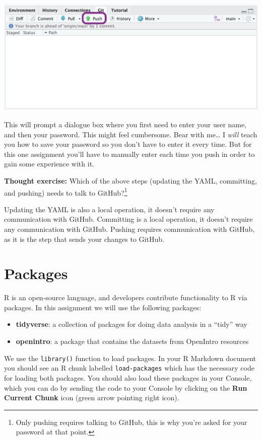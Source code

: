 \documentclass[
]{article}
\providecommand{\tightlist}{%
  \setlength{\itemsep}{0pt}\setlength{\parskip}{0pt}}
\begin{document}
\includegraphics[width=0.8\linewidth]{img/ready-to-push}

This will prompt a dialogue box where you first need to enter your user
name, and then your password. This might feel cumbersome. Bear with
me\ldots{} I \emph{will} teach you how to save your password so you
don't have to enter it every time. But for this one assignment you'll
have to manually enter each time you push in order to gain some
experience with it.

\textbf{Thought exercise:} Which of the above steps (updating the YAML,
committing, and pushing) needs to talk to GitHub?\footnote{Only pushing
  requires talking to GitHub, this is why you're asked for your password
  at that point.}

Updating the YAML is also a local operation, it doesn't require any
communication with GitHub. Committing is a local operation, it doesn't
require any communication with GitHub. Pushing requires communication
with GitHub, as it is the step that sends your changes to GitHub.

\section{Packages}\label{packages}

R is an open-source language, and developers contribute functionality to
R via packages. In this assignment we will use the following packages:

\begin{itemize}
\tightlist
\item
  \textbf{tidyverse}: a collection of packages for doing data analysis
  in a ``tidy'' way
\item
  \textbf{openintro}: a package that contains the datasets from
  OpenIntro resources
\end{itemize}

We use the \texttt{library()} function to load packages. In your R
Markdown document you should see an R chunk labelled
\texttt{load-packages} which has the necessary code for loading both
packages. You should also load these packages in your Console, which you
can do by sending the code to your Console by clicking on the
\textbf{Run Current Chunk} icon (green arrow pointing right icon).
\end{document}
